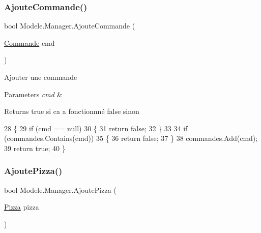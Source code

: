 \subsubsection{\texorpdfstring{Ajoute\+Commande()}{AjouteCommande()}}
{\footnotesize\ttfamily bool Modele.\+Manager.\+Ajoute\+Commande (\begin{DoxyParamCaption}\item[{\hyperlink{classModele_1_1Commande}{Commande}}]{cmd }\end{DoxyParamCaption})\hspace{0.3cm}{\ttfamily [inline]}}



Ajouter une commande 


\begin{DoxyParams}{Parameters}
{\em cmd} & \\
\hline
\end{DoxyParams}
\begin{DoxyReturn}{Returns}
true si ca a fonctionnné false sinon
\end{DoxyReturn}

\begin{DoxyCode}
28         \{
29             \textcolor{keywordflow}{if} (cmd == null)
30             \{
31                 \textcolor{keywordflow}{return} \textcolor{keyword}{false};
32             \}
33 
34             \textcolor{keywordflow}{if} (commandes.Contains(cmd))
35             \{
36                 \textcolor{keywordflow}{return} \textcolor{keyword}{false};
37             \}
38             commandes.Add(cmd);
39             \textcolor{keywordflow}{return} \textcolor{keyword}{true};
40         \}
\end{DoxyCode}
\mbox{\label{classModele_1_1Manager_a91d346733b3a19baa89d09e4c5599345}} 
\subsubsection{\texorpdfstring{Ajoute\+Pizza()}{AjoutePizza()}}
{\footnotesize\ttfamily bool Modele.\+Manager.\+Ajoute\+Pizza (\begin{DoxyParamCaption}\item[{\hyperlink{classModele_1_1Pizza}{Pizza}}]{pizza }\end{DoxyParamCaption})\hspace{0.3cm}{\ttfamily [inline]}}



